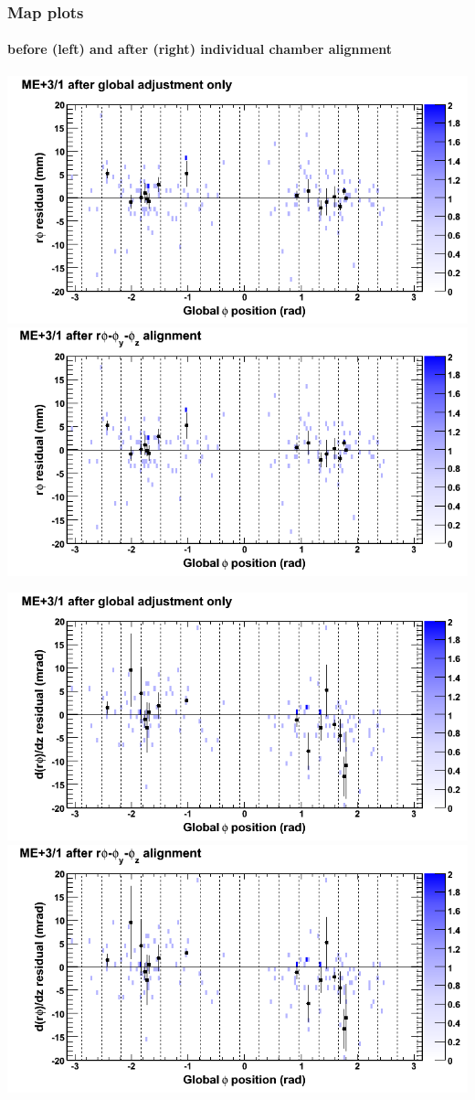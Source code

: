 \documentclass[compress]{beamer}
\begin{document}
\begin{frame}
\frametitle{Map plots}
\framesubtitle{before (left) and after (right) individual chamber alignment}
\includegraphics[width=0.5\linewidth]{ringmapplots_3dof/before_CSCvsphi_mep31_x.png} \includegraphics[width=0.5\linewidth]{ringmapplots_3dof/after_CSCvsphi_mep31_x.png}

\includegraphics[width=0.5\linewidth]{ringmapplots_3dof/before_CSCvsphi_mep31_dxdz.png} \includegraphics[width=0.5\linewidth]{ringmapplots_3dof/after_CSCvsphi_mep31_dxdz.png}
\end{frame}
\end{document}

